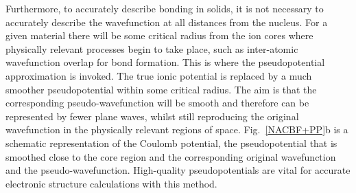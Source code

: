 \documentclass[11pt, twoside]{report}
\begin{document}

Furthermore, to accurately describe bonding in solids, it is not necessary to accurately describe the wavefunction at all distances from the nucleus. For a given material there will be some critical radius from the ion cores where physically relevant processes begin to take place, such as inter-atomic wavefunction overlap for bond formation. This is where the pseudopotential approximation is invoked. The true ionic potential is replaced by a much smoother pseudopotential within some critical radius. The aim is that the corresponding pseudo-wavefunction will be smooth and therefore can be represented by fewer plane waves, whilst still reproducing the original wavefunction in the physically relevant regions of space. Fig.~\ref{NACBF+PP}b is a schematic representation of the Coulomb potential, the pseudopotential that is smoothed close to the core region and the corresponding original wavefunction and the pseudo-wavefunction. High-quality pseudopotentials are vital for accurate electronic structure calculations with this method. 
\end{document}
